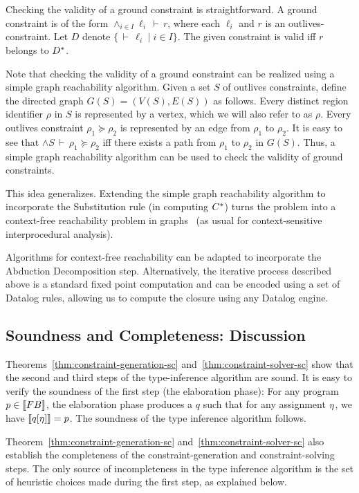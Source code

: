 \documentclass[a4paper,UKenglish]{lipics-v2018}
\newcommand{\conj}{\wedge}
\newcommand{\isvalid}[2]{#1\,\vdash\,#2}
\newcommand{\thesemof}[1]{ \llbracket #1 \rrbracket}
\newcommand{\absof}[1]{\thesemof{#1}}
\newcommand{\FB}{{\sc FB}\xspace}
\newcommand{\outlives}{\succeq}
\begin{document}
Checking the validity of a ground constraint is straightforward.  A
ground constraint is of the form $\isvalid{\conj_{i \in I}
\ell_i}{r}$, where each $\ell_i$ and $r$ is an outlives-constraint.
Let $D$ denote $\{ \isvalid{}{\ell_i} \;|\; i \in I \}$.  The given
constraint is valid iff $r$ belongs to ${D}^*$.

Note that checking the validity of a ground constraint can be realized
using a simple graph reachability algorithm.
%
Given a set $S$ of outlives constraints, define the directed graph
$G(S)=(V(S),E(S))$ as follows.  Every distinct region identifier
$\rho$ in $S$ is represented by a vertex, which we will also refer to
as $\rho$.  Every outlives constraint $\rho_1 \outlives \rho_2$ is
represented by an edge from $\rho_1$ to $\rho_2$.
%
%
It is easy to see that $\isvalid{\conj S}{\rho_1 \outlives \rho_2}$
iff there exists a path from $\rho_1$ to $\rho_2$ in $G(S)$.
%
Thus, a simple graph reachability algorithm can be used to check the
validity of ground constraints.

This idea generalizes.  Extending the simple graph reachability
algorithm to incorporate the Substitution rule (in computing ${C}^*$)
turns the problem into a context-free reachability problem in
graphs~\cite{Reps:Reachability} (as usual for context-sensitive
interprocedural analysis).

Algorithms for context-free reachability can be adapted to incorporate
the Abduction Decomposition step.  Alternatively, the iterative
process described above is a standard fixed point computation and can
be encoded using a set of Datalog rules, allowing us to compute the
closure using any Datalog engine.

\subsection{Soundness and Completeness: Discussion}

Theorems~\ref{thm:constraint-generation-sc}
and~\ref{thm:constraint-solver-sc} show that the second and third
steps of the type-inference algorithm are sound. It is easy to verify
the soundness of the first step (the elaboration phase): For any
program $p \in \absof{\FB}$, the elaboration phase produces a $q$ such
that for any assignment $\eta$, we have $\absof{q[\soln]} = p$.
%
The soundness of the type inference algorithm follows.

Theorem~\ref{thm:constraint-generation-sc} and~\ref{thm:constraint-solver-sc} also
establish the completeness of the constraint-generation and constraint-solving steps.
%
The only source of incompleteness in the type inference algorithm is
the set of heuristic choices made during the first step,
as explained below.
\end{document}
